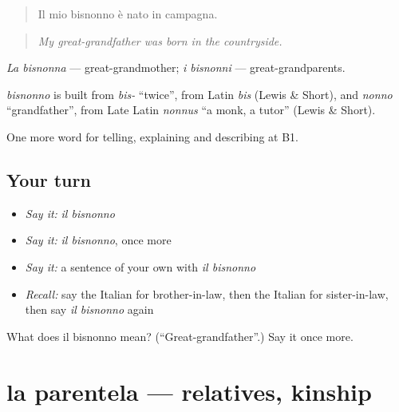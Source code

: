 \begin{quote}
Il mio bisnonno è nato in campagna.
\end{quote}

\begin{quote}
\emph{My great-grandfather was born in the countryside.}
\end{quote}

\emph{La bisnonna} — great-grandmother; \emph{i bisnonni} — great-grandparents.

\begin{cousinweb}
\emph{bisnonno} is built from \emph{bis-} \textquotedblleft{}twice\textquotedblright{}, from Latin \emph{bis} (Lewis \& Short), and \emph{nonno} \textquotedblleft{}grandfather\textquotedblright{}, from Late Latin \emph{nonnus} \textquotedblleft{}a monk, a tutor\textquotedblright{} (Lewis \& Short).
\end{cousinweb}

\begin{grammarlens}[title={What you've built}]
One more word for telling, explaining and describing at B1.
\end{grammarlens}

\subsection*{Your turn}
\begin{itemize}
\raggedright
  \item \emph{Say it:} \emph{il bisnonno}
  \item \emph{Say it:} \emph{il bisnonno}, once more
  \item \emph{Say it:} a sentence of your own with \emph{il bisnonno}
  \item \emph{Recall:} say the Italian for brother-in-law, then the Italian for sister-in-law, then say \emph{il bisnonno} again
\end{itemize}

\begin{tcolorbox}[breakable,colback=teal!4,colframe=teal!35!black,title={Before you move on}]
What does il bisnonno mean? (\textquotedblleft{}Great-grandfather\textquotedblright{}.) Say it once more.
\end{tcolorbox}
\section[la parentela]{la parentela — relatives, kinship}

\label{lesson:IT-C493-parentela}



